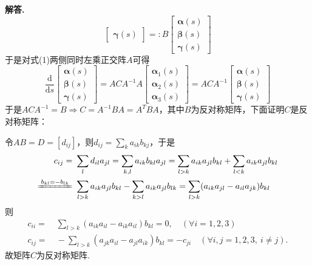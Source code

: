 \documentclass[12pt, a4paper, oneside]{ctexart}
\newenvironment{solution}[1][]{\par\noindent\textbf{#1解答. }}{\smallskip\par}  %
\def\bd{\boldsymbol}        %
\def\d{\mathrm{d}}          %
\begin{document}
\begin{solution}
\begin{equation*}
\begin{bmatrix}
            \bd{\gamma}(s)
        \end{bmatrix}=: B\begin{bmatrix}
            \bd{\alpha}(s)\\
            \bd{\beta}(s)\\
            \bd{\gamma}(s)
        \end{bmatrix}
    \end{equation*}
    于是对式(1)两侧同时左乘正交阵$A$可得
    \begin{equation*}
        \frac{\d}{\d s}\begin{bmatrix}
            \bd{\alpha}(s)\\
            \bd{\beta}(s)\\
            \bd{\gamma}(s)
        \end{bmatrix} = ACA^{-1}A\begin{bmatrix}
            \bd{\alpha}_1(s)\\
            \bd{\alpha}_2(s)\\
            \bd{\alpha}_3(s)
        \end{bmatrix} = ACA^{-1}\begin{bmatrix}
            \bd{\alpha}(s)\\
            \bd{\beta}(s)\\
            \bd{\gamma}(s)
        \end{bmatrix}
    \end{equation*}
    于是$ACA^{-1} = B\Rightarrow C = A^{-1}BA = A^TBA$，其中$B$为反对称矩阵，下面证明$C$是反对称矩阵：

    令$AB = D = [d_{ij}]$，则$d_{ij} = \sum_{k}a_{ik}b_{kj}$，于是
    \begin{align*}
        c_{ij} =&\ \sum_{l}d_{il}a_{jl} = \sum_{k,l}a_{ik}b_{kl}a_{jl} = \sum_{l > k}a_{ik}a_{jl}b_{kl} + \sum_{l < k}a_{ik}a_{jl}b_{kl}\\
        \xlongequal{b_{kl}=-b_{lk}}&\ \sum_{l > k}a_{ik}a_{jl}b_{kl} - \sum_{k > l}a_{ik}a_{jl}b_{lk}
        = \sum_{l > k}(a_{ik}a_{jl} - a_{il}a_{jk})b_{kl}
    \end{align*}
    则
    \begin{align*}
        c_{ii} =&\ \sum_{l > k}(a_{ik}a_{il}-a_{ik}a_{il})b_{kl} = 0,\quad(\forall i = 1,2,3)\\
        c_{ij} =&\ -\sum_{l > k}(a_{jk}a_{il} - a_{jl}a_{ik})b_{kl} = -c_{ji}\quad(\forall i,j = 1,2,3,\ i\neq j).
    \end{align*}
    故矩阵$C$为反对称矩阵.
\end{solution}
\end{document}
